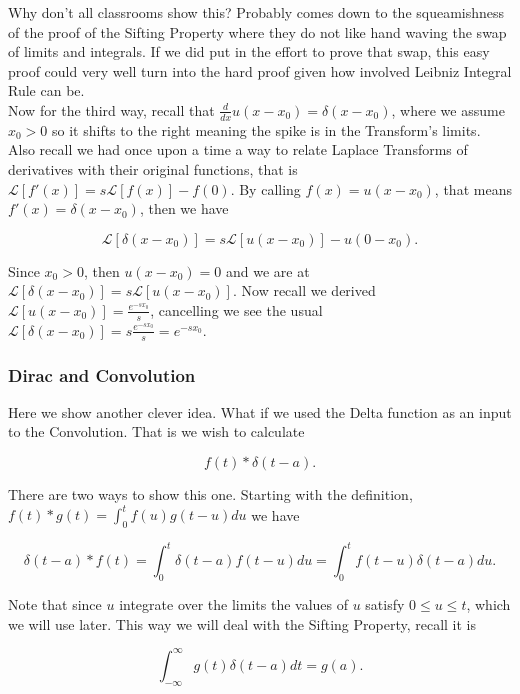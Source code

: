 \documentclass[12pt]{article}
\newcommand{\lp}{\mathscr{L}}
\begin{document}
Why don't all classrooms show this? Probably comes down to the squeamishness of the proof of the Sifting Property where they do not like hand waving the swap of limits and integrals. If we did put in the effort to prove that swap, this easy proof could very well turn into the hard proof given how involved Leibniz Integral Rule can be. \\

Now for the third way, recall that $\frac{d}{dx}u(x-x_0)=\delta(x-x_0)$, where we assume $x_0>0$ so it shifts to the right meaning the spike is in the Transform's limits. Also recall we had once upon a time a way to relate Laplace Transforms of derivatives with their original functions, that is $\lp[f'(x)]=s\lp[f(x)]-f(0)$. By calling $f(x)=u(x-x_0)$, that means $f'(x)=\delta(x-x_0)$, then we have

\begin{equation*}
    \lp[\delta(x-x_0)]=s\lp[u(x-x_0)]-u(0-x_0).
\end{equation*}

Since $x_0>0$, then $u(x-x_0)=0$ and we are at $\lp[\delta(x-x_0)]=s\lp[u(x-x_0)]$. Now recall we derived $\lp[u(x-x_0)]=\frac{e^{-sx_0}}{s}$, cancelling we see the usual $\lp[\delta(x-x_0)]=s\frac{e^{-sx_0}}{s}=e^{-sx_0}$.

\subsubsection{Dirac and Convolution}

Here we show another clever idea. What if we used the Delta function as an input to the Convolution. That is we wish to calculate

\begin{equation*}
    f(t) \ast \delta(t-a).
\end{equation*}

There are two ways to show this one. Starting with the definition, $f(t) \ast g(t) = \int_{0}^{t} f(u)g(t-u) du$ we have

\begin{equation*}
    \delta(t-a) \ast f(t)= \int_{0}^{t} \delta(t-a)f(t-u) du = \int_{0}^{t} f(t-u)\delta(t-a) du.
\end{equation*}

Note that since $u$ integrate over the limits the values of $u$ satisfy $0\leq u\leq t$, which we will use later. This way we will deal with the Sifting Property, recall it is

\begin{equation*}
    \int_{-\infty}^{\infty} g(t)\delta(t-a) dt = g(a).
\end{equation*}
\end{document}
